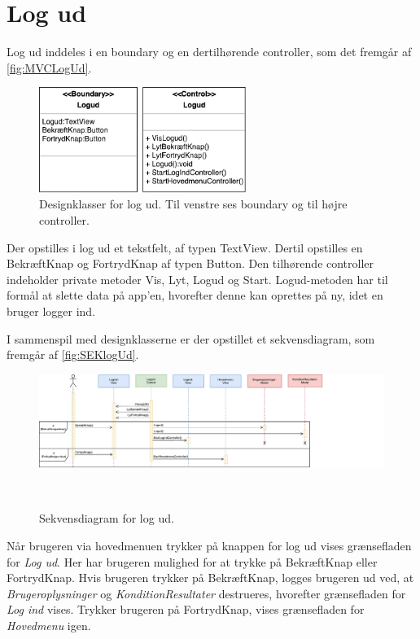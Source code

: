 \section*{Log ud}
Log ud inddeles i en boundary og en dertilhørende controller, som det fremgår af \autoref{fig:MVCLogUd}. 

\begin{figure} [H]
\centering
\includegraphics[width=0.6\textwidth]{figures/MVC/Logud}
\caption{Designklasser for log ud. Til venstre ses boundary og til højre controller.}
\label{fig:MVCLogUd}
\end{figure}

\noindent
Der opstilles i log ud et tekstfelt, af typen TextView. Dertil opstilles en BekræftKnap og FortrydKnap af typen Button. 
Den tilhørende controller indeholder private metoder Vis, Lyt, Logud og Start. Logud-metoden har til formål at slette data på app'en, hvorefter denne kan oprettes på ny, idet en bruger logger ind. 

I sammenspil med designklasserne er der opstillet et sekvensdiagram, som fremgår af \autoref{fig:SEKlogUd}.

\begin{figure} [H]
\centering
\includegraphics[width=1.28\textwidth]{figures/Sek/SEKLogUd}
\caption{Sekvensdiagram for log ud.}
\label{fig:SEKlogUd}\\
\end{figure}

\noindent
Når brugeren via hovedmenuen trykker på knappen for log ud vises grænsefladen for \textit{Log ud}. Her har brugeren mulighed for at trykke på BekræftKnap eller FortrydKnap. Hvis brugeren trykker på BekræftKnap, logges brugeren ud ved, at \textit{Brugeroplysninger} og \textit{KonditionResultater} destrueres, hvorefter grænsefladen for \textit{Log ind} vises. Trykker brugeren på FortrydKnap, vises grænsefladen for \textit{Hovedmenu} igen. 
